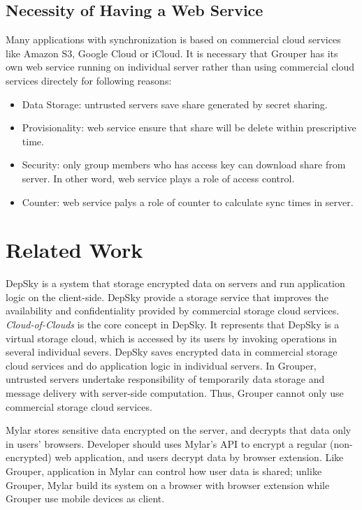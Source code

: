 \documentclass[twocolumn,10pt]{article}
\begin{document}
\subsection{Necessity of Having a Web Service}
Many applications with synchronization is based on commercial cloud services like Amazon S3, Google Cloud or iCloud. It is necessary that Grouper has its own web service running on individual server rather than using commercial cloud services directely for following reasons:

\begin{itemize}
\setlength{\itemsep}{1pt}
\setlength{\parskip}{0pt}
\setlength{\parsep}{0pt}
    \item Data Storage: untrusted servers save share generated by secret sharing.
    \item Provisionality: web service ensure that share will be delete within prescriptive time.
    \item Security: only group members who has access key can download share from server. In other word, web service plays a role of access control.
    \item Counter: web service palys a role of counter to calculate sync times in server.
\end{itemize}

\section{Related Work}

DepSky\cite{bessani2013depsky} is a system that storage encrypted data on servers and run application logic on the client-side\cite{wang2016sieve}. DepSky provide a storage service that improves the availability and confidentiality provided by commercial storage cloud services. \emph{Cloud-of-Clouds} is the core concept in DepSky. It represents that DepSky is a virtual storage cloud, which is accessed by its users by invoking operations in several individual severs. DepSky saves encrypted data in commercial storage cloud services and do application logic in individual servers. In Grouper,  untrusted servers undertake responsibility of temporarily data storage and message delivery with server-side computation. Thus, Grouper cannot only use commercial storage cloud services.

Mylar\cite{popa2014building} stores sensitive data encrypted on the server, and decrypts that data only in users’ browsers. Developer should uses Mylar’s API to encrypt a regular (non-encrypted) web application, and users decrypt data by browser extension. Like Grouper, application in Mylar can control how user data is shared\cite{wang2016sieve}; unlike Grouper, Mylar build its system on a browser with browser extension while Grouper use mobile devices as client.
\end{document}
